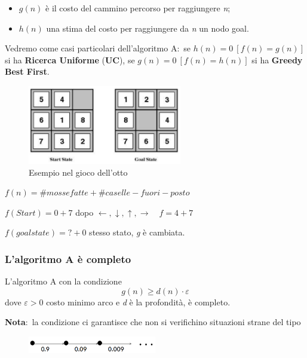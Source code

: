 \begin{itemize}
	\item $g(n)$ è il costo del cammino percorso per raggiungere \textit{n};
	\item $h(n)$ una stima del costo per raggiungere da \textit{n} un nodo goal.
\end{itemize}
Vedremo come casi particolari dell'algoritmo A:\ se $h(n) = 0\ [f(n) = g(n)]$ si ha \textbf{Ricerca Uniforme} (\textbf{UC}), se $g(n) = 0\ [f(n) = h(n)]$ si ha \textbf{Greedy Best First}.

\begin{figure}[H]
	\centering
	\caption*{Esempio nel gioco dell'otto}
	\includegraphics[width=0.6\textwidth]{immagini/otto_euristica.png}
\end{figure}

\noindent $f(n) = \#mosse fatte + \#caselle-fuori-posto$

\noindent $f(Start) = 0 + 7$ \qquad dopo $\leftarrow, \downarrow, \uparrow, \rightarrow\quad f = 4 + 7$

\noindent$f(goal state)=?+0$ stesso stato, \textit{g} è cambiata.

\subsubsection{L'algoritmo A è completo}

\begin{theorem}
	L'algoritmo A con la condizione
	\[ g(n) \geq d(n)\cdot \varepsilon \]
	dove $\varepsilon >0$ costo minimo arco e \textit{d} è la profondità, è completo.
\end{theorem}

\noindent\textbf{Nota}:\ la condizione ci garantisce che non si verifichino situazioni strane del tipo

\begin{figure}[H]
	\centering
	\includegraphics[width=0.5\textwidth]{immagini/AlgoritmoA_teorema.png}
\end{figure}

